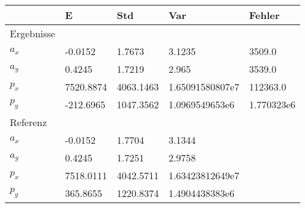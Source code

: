 \begin{tabular}{l|l|l|l|l}

     & E   & Std    & Var    & Fehler \\ 

\hline 

\hline 


Ergebnisse & & & & \\ 

$a_x$  & -0.0152 & 1.7673 & 3.1235 & 3509.0 \\ 

$a_y$  & 0.4245 & 1.7219 & 2.965 & 3539.0 \\ 

$p_x$  & 7520.8874 & 4063.1463 & 1.65091580807e7 & 112363.0 \\ 

$p_y$  & -212.6965 & 1047.3562 & 1.0969549653e6 & 1.770323e6 \\ 


\hline 

Referenz & & & & \\ 

$a_x$  & -0.0152 & 1.7704 & 3.1344 & \\ 

$a_y$  & 0.4245 & 1.7251 & 2.9758 & \\ 

$p_x$  & 7518.0111 & 4042.5711 & 1.63423812649e7 & \\ 

$p_y$  & 365.8655 & 1220.8374 & 1.4904438383e6 & \\ 

\end{tabular}
